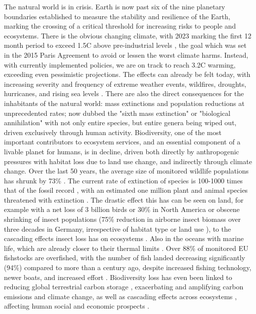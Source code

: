The natural world is in crisis. 
Earth is now past six of the nine planetary boundaries \cite{Richardson2023} established to measure the stability and resilience of the Earth, marking the crossing of a critical threshold for increasing risks to people and ecosystems.
There is the obvious changing climate, with 2023 marking the first 12 month period to exceed 1.5\degree C above pre-industrial levels \cite{Service2024}, the goal which was set in the 2015 Paris Agreement \cite{Delbeke2019} to avoid or lessen the worst climate harms. Instead, with currently implemented policies, we are on track to reach 3.2\degree C \cite{Report2023} warming, exceeding even pessimistic projections. The effects can already be felt today, with  increasing severity and frequency of extreme weather events, wildfires, droughts, hurricanes, and rising sea levels \cite{Report2023}. 
There are also the direct consequences for the inhabitants of the natural world: mass extinctions and population reductions at unprecedented rates; now dubbed the "sixth mass extinction" \cite{Ceballos2015} or "biological annihilation" \cite{Ceballos2017} with not only entire species, but entire genera being wiped out\cite{Ceballos2023}, driven exclusively through human activity. Biodiversity, one of the most important contributors to ecosystem services, and an essential component of a livable planet for humans, is in decline, driven both directly by anthropogenic pressures with habitat loss due to land use change, and indirectly through climate change. Over the last 50 years, the average size of monitored wildlife populations has shrunk by 73\% \cite{WWF2024}. The current rate of extinction of species is 100-1000 times that of the fossil record \cite{Pimm2014, Ceballos2015}, with an estimated one million plant and animal species threatened with extinction \cite{ipbes2019}.
The drastic effect this has can be seen on land, for example with a net loss of 3 billion birds or 30\% in North America \cite{Rosenberg2019} or obscene shrinking of insect populations (75\% reduction in airborne insect biomass over three decades in Germany, irrespective of habitat type or land use \cite{Hallmann2017}), to the cascading effects insect loss has on ecosystems \cite{Kehoe2021}. Also in the oceans with marine life, which are already closer to their thermal limits \cite{Pinsky2019}.
Over 88\% of monitored EU fishstocks are overfished, with the number of fish landed decreasing significantly (94\%) compared to more than a century ago, despite increased fishing technology, newer boats, and increased effort \cite{Thurstan2010}.
Biodiversity loss has even been linked to reducing global terrestrial carbon storage \cite{Weiskopf2024}, exacerbating and amplifying carbon emissions and climate change, as well as cascading effects across ecosystems \cite{Rosenberg2019, Ceballos2015}, affecting human social and economic prospects \cite{Frank2024, Portner2023}.

